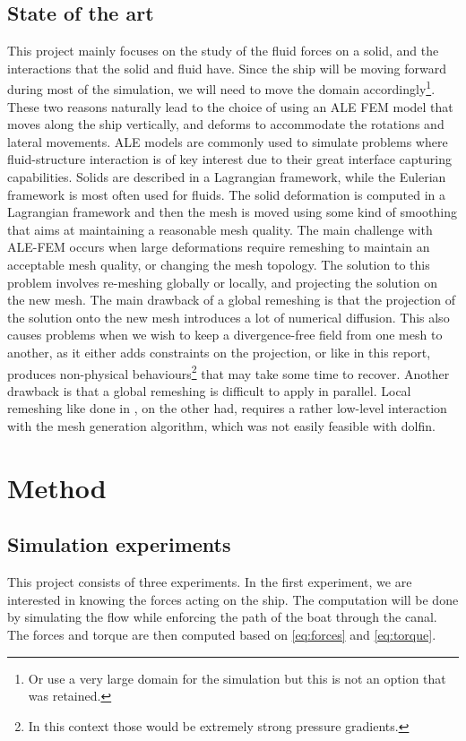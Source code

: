 \documentclass[a4paper]{article}
\begin{document}
\subsection{State of the art}
This project mainly focuses on the study of the fluid forces on a solid, and the interactions that the solid and fluid have. Since the ship will be moving forward during most of the simulation, we will need to move the domain accordingly\footnote{Or use a very large domain for the simulation but this is not an option that was retained.}. These two reasons naturally lead to the choice of using an ALE FEM model that moves along the ship vertically, and deforms to accommodate the rotations and lateral movements. ALE models are commonly used to simulate problems where fluid-structure interaction is of key interest\cite{Jeannette2020Apr}\cite{Wang2018Jul} due to their great interface capturing capabilities. Solids are described in a Lagrangian framework, while the Eulerian framework is most often used for fluids. The solid deformation is computed in a Lagrangian framework and then the mesh is moved using some kind of smoothing that aims at maintaining a reasonable mesh quality.  The main challenge with ALE-FEM occurs when large deformations require remeshing to maintain an acceptable mesh quality, or changing the mesh topology. The solution to this problem involves re-meshing globally or locally, and projecting the solution on the new mesh\cite{Remacle2010May}. The main drawback of a global remeshing is that the projection of the solution onto the new mesh introduces a lot of numerical diffusion. This also causes problems when we wish to keep a divergence-free field from one mesh to another, as it either adds constraints on the projection, or like in this report, produces non-physical behaviours\footnote{In this context those would be extremely strong pressure gradients.} that may take some time to recover. Another drawback is that a global remeshing is difficult to apply in parallel. Local remeshing like done in \cite{Remacle2010May}, on the other had, requires a rather low-level interaction with the mesh generation algorithm, which was not easily feasible with dolfin.

\section{Method}
\subsection{Simulation experiments}
This project consists of three experiments. In the first experiment, we are interested in knowing the forces acting on the ship. The computation will be done by simulating the flow while enforcing the path of the boat through the canal. The forces and torque are then computed based on \eqref{eq:forces} and \eqref{eq:torque}.
\end{document}
